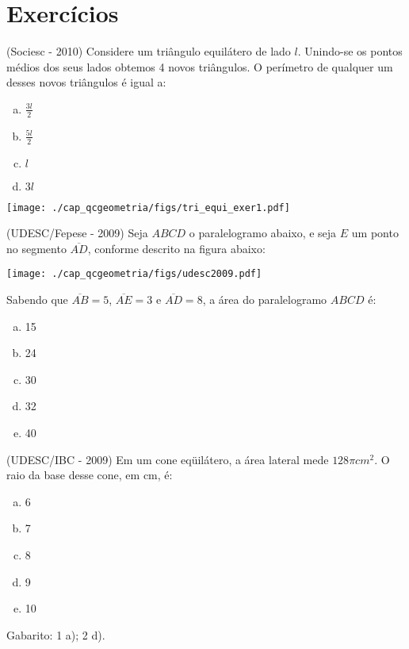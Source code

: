 
\section{Exercícios}

\begin{exer}
 (Sociesc - 2010) Considere um triângulo equilátero de lado $l$. Unindo-se os pontos médios dos seus lados obtemos 4 novos triângulos. O perímetro de qualquer um desses novos triângulos é igual a:

 \begin{multicols}{2}

 \begin{enumerate}[a)]
  \item $\frac{3l}{2}$
  \item $\frac{5l}{2}$
  \item $l$
  \item $3l$
 \end{enumerate}

 \texttt{[image: ./cap\_qcgeometria/figs/tri\_equi\_exer1.pdf]}

 \end{multicols}
 \end{exer}

  \begin{exer}
 (UDESC/Fepese - 2009) Seja $ABCD$ o paralelogramo abaixo, e seja $E$ um ponto no segmento $\overline{AD}$, conforme descrito na figura abaixo:

  \begin{center}
 \texttt{[image: ./cap\_qcgeometria/figs/udesc2009.pdf]}
 \end{center}

  Sabendo que $\overline{AB} = 5$, $\overline{AE} = 3$ e $\overline{AD} = 8$, a área do paralelogramo $ABCD$ é:
  \begin{enumerate}[a)]
  \item 15
  \item 24
  \item 30
  \item 32
  \item 40
 \end{enumerate}
 \end{exer}

 \begin{exer}
 (UDESC/IBC - 2009) Em um cone eqüilátero, a área lateral mede $128 \pi cm^2$. O raio da base desse cone, em cm, é:
 \begin{enumerate}[a)]
  \item 6
  \item 7
  \item 8
  \item 9
  \item 10
 \end{enumerate}
 \end{exer}

 Gabarito: 1 a); 2 d).
